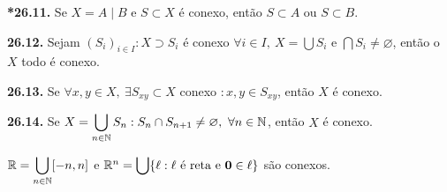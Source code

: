 
\begin{lemma}
    \textbf{*26.11.} Se \( X = A \mid B\) e \(S \subset X\) é conexo, então \(S \subset A\) ou \(S \subset B\). 
\end{lemma}

\hypertarget{prop2612}{}
\begin{proposition}
    \textbf{26.12.} Sejam \((S_i)_{i\in I} : X \supset S_i \) é conexo \(\forall i \in I,  \ X = \bigcup S_i\) e \(\bigcap S_i \neq \varnothing\), então o \(X\) todo é conexo.  
\end{proposition}

\begin{proposition}
    \textbf{26.13.} Se \(\forall x,y \in X, \ \exists S_{xy} \subset X \) conexo \(: x,y \in S_{xy}\), então \(X \) é conexo.  
\end{proposition}

\begin{proposition}
    \textbf{26.14.} Se \(X = \displaystyle\bigcup_{n\in \mathbb{N}} S_n : S_n \cap S_{n+1} \neq \varnothing, \ \forall n \in \mathbb{N}\), então \(X\) é conexo. %
\end{proposition}


\begin{example}
    \(\mathbb{R} = \displaystyle\bigcup_{n\in \mathbb{N}}[-n,n]\) e \(\mathbb{R}^n = \displaystyle\bigcup \{\ell : \ell \text{ é reta e \textbf{0}} \in \ell\}\) são conexos.   
\end{example}

